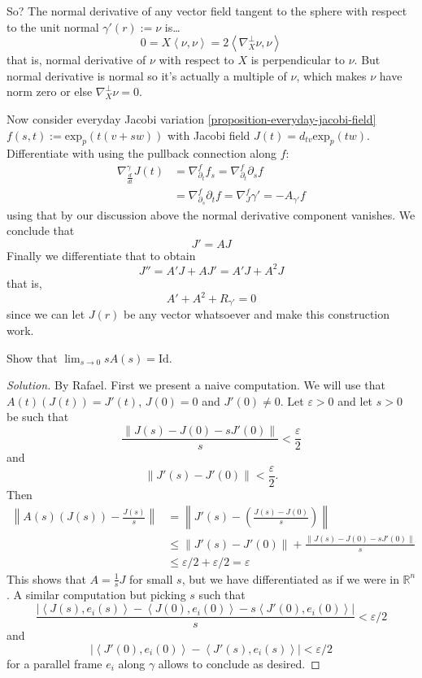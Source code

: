 So? The normal derivative of any vector field tangent to the sphere with respect
to the unit normal $\gamma'(r):=\nu$ is…
$$
0=X\left<\nu,\nu\right>=2\left<\nabla^\perp_X \nu,\nu\right>
$$
that is, normal derivative of $\nu$ with respect to $X$ is perpendicular to
$\nu$. But normal derivative is normal so it's actually a multiple of $\nu$, 
which makes $\nu$ have norm zero or else $\nabla^\perp_X \nu=0$.

Now consider everyday Jacobi variation \ref{proposition-everyday-jacobi-field}
 $f(s,t):=\text{exp}_p(t(v+sw))$ with Jacobi field
$J(t)=d_{tv}\text{exp}_p(tw)$. Differentiate with using the pullback connection
along $f$:
\begin{align*}
\nabla_{\frac{d}{dt}}^\gamma
J(t)&=\nabla_{\partial_t}^ff_s=\nabla_{\partial_t}^f \partial_sf\\
&=\nabla_{\partial_s}^f \partial_t f=\nabla_{J}^f \gamma' = -A_{\gamma'}f
\end{align*}
using that by our discussion above the normal derivative component vanishes. We
conclude that
\begin{equation}
\label{equation-Jacobi-field-derivative-is-shape-operator}
J'=AJ
\end{equation}
Finally we differentiate that to obtain
$$
J''=A'J+AJ'=A'J+A^2J
$$
that is,
\begin{equation}
\label{equation-Riccati}
A'+A^2+R_{\gamma'}=0
\end{equation}
since we can let $J(r)$ be any vector whatsoever and make this construction
work.
\begin{exercise}
\label{exercise-limit-of-shape-operator}
Show that $\lim_{s\to0}sA(s)=\text{Id}$.
\end{exercise}

\begin{proof}[Solution]
By Rafael. First we present a naive computation. We will use that
$A(t)(J(t))=J'(t)$,  $J(0)=0$ and $J'(0)\neq 0$. Let $\varepsilon>0$ and let
$s>0$ be such that
$$
\frac{\|J(s)-J(0)-sJ'(0)\|}{s}<\frac{\varepsilon}{2}
$$
and
$$
\|J'(s)-J'(0)\|<\frac{\varepsilon}{2}.
$$
Then
\begin{align*}
\left\|A(s)(J(s))-\frac{J(s)}{s}\right\|&
=\left\|J'(s)-\left(\frac{J(s)-J(0)}{s}\right)\right\|\\
&\leq \|J'(s)-J'(0)\|+\frac{\|J(s)-J(0)-sJ'(0)\|}{s}\\
&\leq\varepsilon/2+\varepsilon/2=\varepsilon
\end{align*}
This shows that $A=\frac{1}{s}J$ for small $s$, but we have differentiated as if
we were in $\mathbb{R}^n$. A similar computation but picking $s$ such that
$$
\frac{|\left<J(s),e_i(s)\right>-\left<J(0),e_i(0)\right>
-s\left<J'(0),e_i(0)\right>|}{s}<\varepsilon/2
$$
and
$$
|\left<J'(0),e_i(0)\right>-\left<J'(s),e_i(s)\right>|<\varepsilon/2
$$
for a parallel frame $e_i$ along $\gamma$ allows to conclude as desired.
\end{proof}

